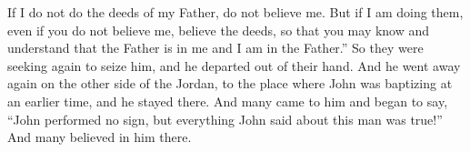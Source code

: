 \begin{biblechapter}
\verse If I do not do the deeds of my Father, do not believe me.
\verse But if I am doing them, even if you do not believe me, believe the deeds, so that you may know and understand that the Father is in me and I am in the Father.”
\verse So they were seeking again to seize him, and he departed out of their hand.
\verse And he went away again on the other side of the Jordan, to the place where John was baptizing at an earlier time, and he stayed there.
\verse And many came to him and began to say, “John performed no sign, but everything John said about this man was true!”
\verse And many believed in him there.
\end{biblechapter}

